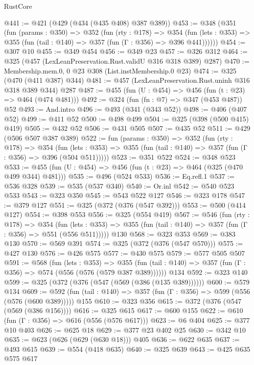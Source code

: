 \begin{lexlean}{RustCore}
\begin{coremodule}
@441 := @421 (@429 (@434 (@435 @408) @387 @389))
@453 := @348
    (@351
      (fun (params : @350) =>
      @352
        (fun (rty : @178) =>
        @354
          (fun (lets : @353) => @355 (fun (tail : @140) => @357 (fun (Γ : @356) => @396 @441))))))
@454 := @307 @10
@455 := @349 @454
@456 := @349 @23
@457 := @326 @312
@464 := @325 (@457 (LexLeanPreservation.Rust.validU @316 @318 @389) @287)
@470 := Membership.mem.{0, 0} @23 @308 (List.instMembership.{0} @23)
@474 := @325 (@470 (@411 @387) @344)
@481 := @457 (LexLeanPreservation.Rust.uninh @316 @318 @389 @344) @287
@487 := @455 (fun (U : @454) => @456 (fun (t : @23) => @464 (@474 @481)))
@492 := @324 (fun (fn : @7) => @347 (@453 @487)) @52
@493 := And.intro
@496 := @493 (@341 (@343 @52))
@498 := @406 (@407 @52)
@499 := @411 @52
@500 := @498 @499
@504 := @325 (@398 (@500 @415) @419)
@505 := @432 @52
@506 := @431 @505
@507 := @435 @52
@511 := @429 (@506 @507 @387 @389)
@522 := fun (params : @350) =>
  @352
    (fun (rty : @178) =>
    @354
      (fun (lets : @353) => @355 (fun (tail : @140) => @357 (fun (Γ : @356) => @396 (@504 @511)))))
@523 := @351 @522
@524 := @348 @523
@533 := @455 (fun (U : @454) => @456 (fun (t : @23) => @464 (@325 (@470 @499 @344) @481)))
@535 := @496 (@524 @533)
@536 := Eq.refl.{1}
@537 := @536 @328
@539 := @535 (@537 @340)
@540 := Or.inl
@542 := @540 @523 @533
@543 := @323 @350
@545 := @543 @522 @127
@546 := @323 @178
@547 := @379 @127
@551 := @325 (@372 (@376 (@547 @392)))
@553 := @500 (@414 @127)
@554 := @398 @553
@556 := @325 (@554 @419)
@567 := @546
    (fun (rty : @178) =>
    @354
      (fun (lets : @353) => @355 (fun (tail : @140) => @357 (fun (Γ : @356) => @551 (@556 @511)))))
    @130
@568 := @323 @353
@569 := @383 @130
@570 := @569 @391
@574 := @325 (@372 (@376 (@547 @570)))
@575 := @427 @130
@576 := @426 @575
@577 := @430 @575
@579 := @577 @505 @507
@591 := @568
    (fun (lets : @353) =>
    @355 (fun (tail : @140) => @357 (fun (Γ : @356) => @574 (@556 (@576 (@579 @387 @389))))))
    @134
@592 := @323 @140
@599 := @325 (@372 (@376 (@547 (@569 (@386 (@135 @389))))))
@600 := @579 @134
@609 := @592 (fun (tail : @140) => @357 (fun (Γ : @356) => @599 (@556 (@576 (@600 @389))))) @155
@610 := @323 @356
@615 := @372 (@376 (@547 (@569 (@386 @156))))
@616 := @325 @615
@617 := @600 @155
@622 := @610 (fun (Γ : @356) => @616 (@556 (@576 @617)))
@623 := @6 @404
@625 := @377 @10 @403
@626 := @625 @18
@629 := @377 @23 @402 @25
@630 := @342 @10
@635 := @623 (@626 (@629 (@630 @18))) @405
@636 := @622 @635
@637 := @493 @615
@639 := @554 (@418 @635)
@640 := @325 @639
@643 := @425 @635 @575 @617

\end{coremodule}
\end{lexlean}
